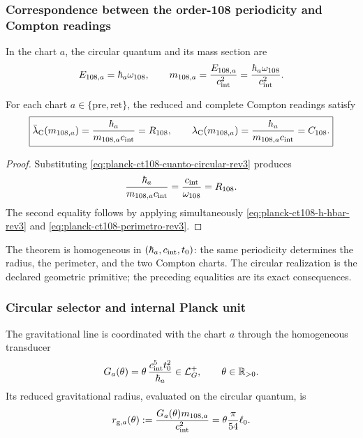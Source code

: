 \subsubsection{Correspondence between the order-108 periodicity and Compton readings}

In the chart \(a\), the circular quantum and its mass section are
\begin{equation}
 E_{108,a}=\hbar_a\omega_{108},
 \qquad
 m_{108,a}=\frac{E_{108,a}}{c_{\rm int}^{2}}
 =\frac{\hbar_a\omega_{108}}{c_{\rm int}^{2}}.
 \label{eq:planck-ct108-cuanto-circular-rev3}
\end{equation}

\begin{theorem}
\label{thm:planck-ct108-compton-rev3}
For each chart \(a\in\{\mathrm{pre},\mathrm{ret}\}\), the reduced and complete
Compton readings satisfy
\begin{equation}
 \boxed{
 \bar\lambda_{\rm C}(m_{108,a})
 =\frac{\hbar_a}{m_{108,a}c_{\rm int}}=R_{108},
 \qquad
 \lambda_{\rm C}(m_{108,a})
 =\frac{h_a}{m_{108,a}c_{\rm int}}=C_{108}.}
 \label{eq:planck-ct108-identidad-compton-rev3}
\end{equation}
\end{theorem}

\begin{proof}
Substituting
\eqref{eq:planck-ct108-cuanto-circular-rev3} produces
\[
 \frac{\hbar_a}{m_{108,a}c_{\rm int}}
 =\frac{c_{\rm int}}{\omega_{108}}=R_{108}.
\]
The second equality follows by applying simultaneously
\eqref{eq:planck-ct108-h-hbar-rev3} and
\eqref{eq:planck-ct108-perimetro-rev3}.
\end{proof}

The theorem is homogeneous in
\((\hbar_a,c_{\rm int},t_0)\): the same periodicity determines the radius,
the perimeter, and the two Compton charts. The circular realization is the
declared geometric primitive; the preceding equalities are its
exact consequences.

\subsubsection{Circular selector and internal Planck unit}

The gravitational line is coordinated with the chart \(a\) through the homogeneous
transducer
\begin{equation}
 G_a(\theta)=\theta\,
 \frac{c_{\rm int}^{5}t_0^2}{\hbar_a}
 \in\mathcal L_G^+,
 \qquad \theta\in\mathbb R_{>0}.
 \label{eq:planck-ct108-transductor-rev3}
\end{equation}
Its reduced gravitational radius, evaluated on the circular quantum, is
\begin{equation}
 r_{{\rm g},a}(\theta)
 :=\frac{G_a(\theta)m_{108,a}}{c_{\rm int}^{2}}
 =\theta\frac{\pi}{54}\ell_0.
 \label{eq:planck-ct108-radio-gravitatorio-rev3}
\end{equation}

